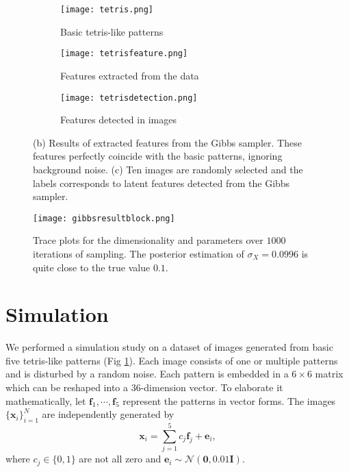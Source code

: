 \documentclass{article}
\begin{document}
\begin{figure}[!h]
  \centering
  \begin{subfigure}[b]{\textwidth}
    \centering
    \texttt{[image: tetris.png]}
    \caption{Basic tetris-like patterns}
    \label{fig::tetris}
  \end{subfigure}
  \begin{subfigure}[b]{\textwidth}
    \centering
    \texttt{[image: tetrisfeature.png]}
    \caption{Features extracted from the data}
    \label{fig::tetrisfeature}
  \end{subfigure}
  \begin{subfigure}[b]{\textwidth}
    \centering
    \texttt{[image: tetrisdetection.png]}
    \caption{Features detected in images} 
    \label{fig::tetrisfeature}
  \end{subfigure}
  \caption{(b) Results of extracted features from the Gibbs sampler. These features perfectly coincide with the basic patterns, ignoring background noise. (c) Ten images are randomly selected and the labels corresponds to latent features detected from the Gibbs sampler.}
\end{figure}

\begin{figure}[!h]
  \centering
  \texttt{[image: gibbsresultblock.png]}
  \caption{Trace plots for the dimensionality and parameters over $1000$ iterations of sampling. The posterior estimation of $\sigma_X = 0.0996$ is quite close to the true value $0.1$.}
  \label{fig::gibbsblock}
\end{figure}

\section{Simulation}\label{sec::simulation}

We performed a simulation study on a dataset of images generated from basic five tetris-like patterns (Fig \ref{fig::tetris}). Each image consists of one or multiple patterns and is disturbed by a random noise. Each pattern is embedded in a $6\times 6$ matrix which can be reshaped into a $36$-dimension vector. To elaborate it mathematically, let $\boldsymbol{f}_1, \cdots, \boldsymbol{f}_5$ represent the patterns in vector forms. The images $\{\boldsymbol{x}_{i}\}_{i=1}^N$ are independently generated by \begin{equation}\boldsymbol{x}_i = \sum_{j=1}^5 c_j \boldsymbol{f}_j + \boldsymbol{e}_i,\end{equation} where $c_j\in\{0,1\}$ are not all zero and $\boldsymbol{e}_i\sim\mathcal{N}(\boldsymbol{0}, 0.01 \mathbf{I})$.
\end{document}
